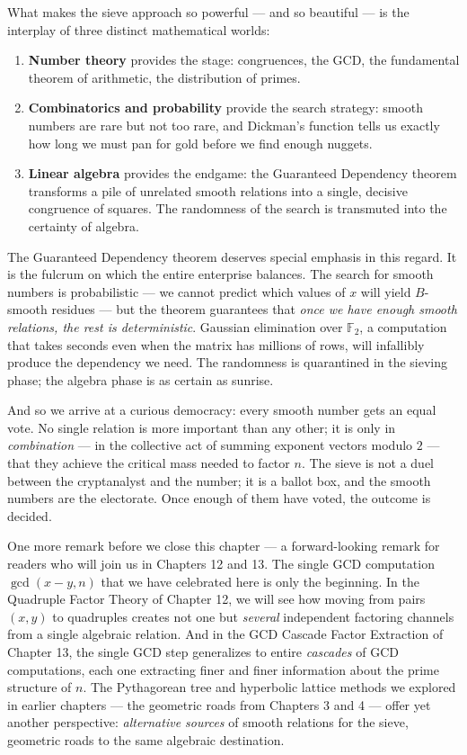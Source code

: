\documentclass[11pt,twoside,openright]{book}
\theoremstyle{definition}
\theoremstyle{remark}
\begin{document}
What makes the sieve approach so powerful --- and so beautiful --- is the interplay of three distinct mathematical worlds:

\begin{enumerate}
  \item \textbf{Number theory} provides the stage: congruences, the GCD, the fundamental theorem of arithmetic, the distribution of primes.

  \item \textbf{Combinatorics and probability} provide the search strategy: smooth numbers are rare but not too rare, and Dickman's function tells us exactly how long we must pan for gold before we find enough nuggets.

  \item \textbf{Linear algebra} provides the endgame: the Guaranteed Dependency theorem transforms a pile of unrelated smooth relations into a single, decisive congruence of squares. The randomness of the search is transmuted into the certainty of algebra.
\end{enumerate}

The Guaranteed Dependency theorem deserves special emphasis in this regard. It is the fulcrum on which the entire enterprise balances. The search for smooth numbers is probabilistic --- we cannot predict which values of $x$ will yield $B$-smooth residues --- but the theorem guarantees that \textit{once we have enough smooth relations, the rest is deterministic}. Gaussian elimination over $\mathbb{F}_2$, a computation that takes seconds even when the matrix has millions of rows, will infallibly produce the dependency we need. The randomness is quarantined in the sieving phase; the algebra phase is as certain as sunrise.

And so we arrive at a curious democracy: every smooth number gets an equal vote. No single relation is more important than any other; it is only in \textit{combination} --- in the collective act of summing exponent vectors modulo $2$ --- that they achieve the critical mass needed to factor $n$. The sieve is not a duel between the cryptanalyst and the number; it is a ballot box, and the smooth numbers are the electorate. Once enough of them have voted, the outcome is decided.


One more remark before we close this chapter --- a forward-looking remark for readers who will join us in Chapters 12 and 13. The single GCD computation $\gcd(x - y, n)$ that we have celebrated here is only the beginning. In the Quadruple Factor Theory of Chapter 12, we will see how moving from pairs $(x, y)$ to quadruples creates not one but \textit{several} independent factoring channels from a single algebraic relation. And in the GCD Cascade Factor Extraction of Chapter 13, the single GCD step generalizes to entire \textit{cascades} of GCD computations, each one extracting finer and finer information about the prime structure of $n$. The Pythagorean tree and hyperbolic lattice methods we explored in earlier chapters --- the geometric roads from Chapters 3 and 4 --- offer yet another perspective: \textit{alternative sources} of smooth relations for the sieve, geometric roads to the same algebraic destination.
\end{document}
